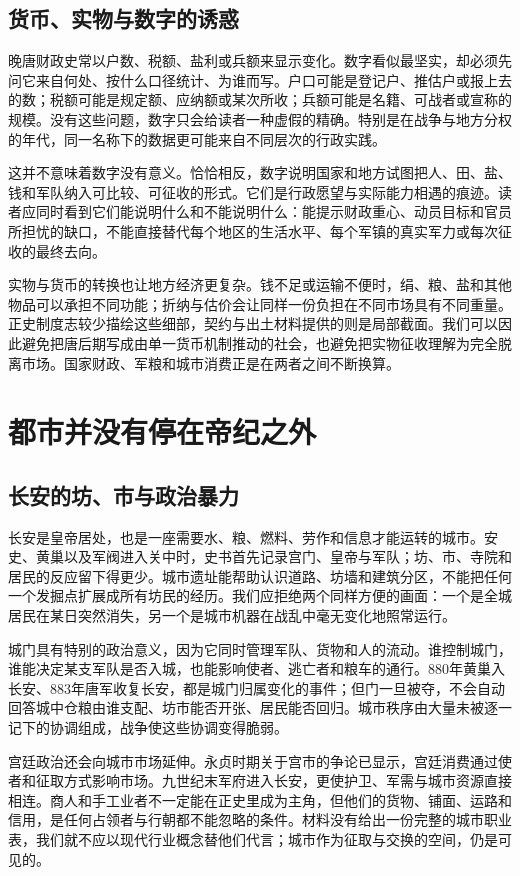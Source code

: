 \subsection{货币、实物与数字的诱惑}
晚唐财政史常以户数、税额、盐利或兵额来显示变化。数字看似最坚实，却必须先问它来自何处、按什么口径统计、为谁而写。户口可能是登记户、推估户或报上去的数；税额可能是规定额、应纳额或某次所收；兵额可能是名籍、可战者或宣称的规模。没有这些问题，数字只会给读者一种虚假的精确。特别是在战争与地方分权的年代，同一名称下的数据更可能来自不同层次的行政实践。

这并不意味着数字没有意义。恰恰相反，数字说明国家和地方试图把人、田、盐、钱和军队纳入可比较、可征收的形式。它们是行政愿望与实际能力相遇的痕迹。读者应同时看到它们能说明什么和不能说明什么：能提示财政重心、动员目标和官员所担忧的缺口，不能直接替代每个地区的生活水平、每个军镇的真实军力或每次征收的最终去向。

实物与货币的转换也让地方经济更复杂。钱不足或运输不便时，绢、粮、盐和其他物品可以承担不同功能；折纳与估价会让同样一份负担在不同市场具有不同重量。正史制度志较少描绘这些细部，契约与出土材料提供的则是局部截面。我们可以因此避免把唐后期写成由单一货币机制推动的社会，也避免把实物征收理解为完全脱离市场。国家财政、军粮和城市消费正是在两者之间不断换算。

\section{都市并没有停在帝纪之外}

\subsection{长安的坊、市与政治暴力}
长安是皇帝居处，也是一座需要水、粮、燃料、劳作和信息才能运转的城市。安史、黄巢以及军阀进入关中时，史书首先记录宫门、皇帝与军队；坊、市、寺院和居民的反应留下得更少。城市遗址能帮助认识道路、坊墙和建筑分区，不能把任何一个发掘点扩展成所有坊民的经历。我们应拒绝两个同样方便的画面：一个是全城居民在某日突然消失，另一个是城市机器在战乱中毫无变化地照常运行。

城门具有特别的政治意义，因为它同时管理军队、货物和人的流动。谁控制城门，谁能决定某支军队是否入城，也能影响使者、逃亡者和粮车的通行。880年黄巢入长安、883年唐军收复长安，都是城门归属变化的事件；但门一旦被夺，不会自动回答城中仓粮由谁支配、坊市能否开张、居民能否回归。城市秩序由大量未被逐一记下的协调组成，战争使这些协调变得脆弱。

宫廷政治还会向城市市场延伸。永贞时期关于宫市的争论已显示，宫廷消费通过使者和征取方式影响市场。九世纪末军府进入长安，更使护卫、军需与城市资源直接相连。商人和手工业者不一定能在正史里成为主角，但他们的货物、铺面、运路和信用，是任何占领者与行朝都不能忽略的条件。材料没有给出一份完整的城市职业表，我们就不应以现代行业概念替他们代言；城市作为征取与交换的空间，仍是可见的。

